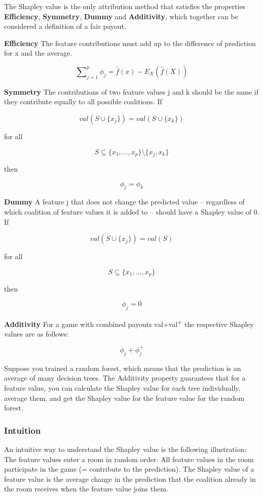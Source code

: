 \documentclass[
  12pt,
]{krantz}
\begin{document}
The Shapley value is the only attribution method that satisfies the properties \textbf{Efficiency}, \textbf{Symmetry}, \textbf{Dummy} and \textbf{Additivity}, which together can be considered a definition of a fair payout.

\textbf{Efficiency}
The feature contributions must add up to the difference of prediction for x and the average.

\[\sum\nolimits_{j=1}^p\phi_j=\hat{f}(x)-E_X(\hat{f}(X))\]

\textbf{Symmetry}
The contributions of two feature values j and k should be the same if they contribute equally to all possible coalitions.
If

\[val(S\cup\{x_j\})=val(S\cup\{x_k\})\]

for all

\[S\subseteq\{x_{1},\ldots,x_{p}\}\setminus\{x_j,x_k\}\]

then

\[\phi_j=\phi_{k}\]

\textbf{Dummy}
A feature j that does not change the predicted value -- regardless of which coalition of feature values it is added to -- should have a Shapley value of 0.
If

\[val(S\cup\{x_j\})=val(S)\]

for all

\[S\subseteq\{x_{1},\ldots,x_{p}\}\]

then

\[\phi_j=0\]

\textbf{Additivity}
For a game with combined payouts val+val\textsuperscript{+} the respective Shapley values are as follows:

\[\phi_j+\phi_j^{+}\]

Suppose you trained a random forest, which means that the prediction is an average of many decision trees.
The Additivity property guarantees that for a feature value, you can calculate the Shapley value for each tree individually, average them, and get the Shapley value for the feature value for the random forest.

\hypertarget{intuition}{%
\subsubsection{Intuition}\label{intuition}}

An intuitive way to understand the Shapley value is the following illustration:
The feature values enter a room in random order.
All feature values in the room participate in the game (= contribute to the prediction).
The Shapley value of a feature value is the average change in the prediction that the coalition already in the room receives when the feature value joins them.
\end{document}
